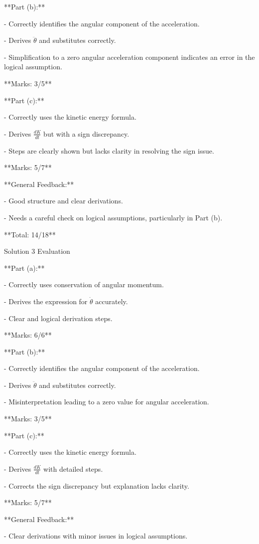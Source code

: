 \documentclass[a4paper,11pt]{article}
\begin{document}
**Part (b):**

- Correctly identifies the angular component of the acceleration.

- Derives \(\ddot{\theta}\) and substitutes correctly.

- Simplification to a zero angular acceleration component indicates an error in the logical assumption.

**Marks: 3/5**

**Part (c):**

- Correctly uses the kinetic energy formula.

- Derives \(\frac{dK}{dt}\) but with a sign discrepancy.

- Steps are clearly shown but lacks clarity in resolving the sign issue.

**Marks: 5/7**

**General Feedback:**

- Good structure and clear derivations.

- Needs a careful check on logical assumptions, particularly in Part (b).

**Total: 14/18**

Solution 3 Evaluation

**Part (a):**

- Correctly uses conservation of angular momentum.

- Derives the expression for \(\dot{\theta}\) accurately.

- Clear and logical derivation steps.

**Marks: 6/6**

**Part (b):**

- Correctly identifies the angular component of the acceleration.

- Derives \(\ddot{\theta}\) and substitutes correctly.

- Misinterpretation leading to a zero value for angular acceleration.

**Marks: 3/5**

**Part (c):**

- Correctly uses the kinetic energy formula.

- Derives \(\frac{dK}{dt}\) with detailed steps.

- Corrects the sign discrepancy but explanation lacks clarity.

**Marks: 5/7**

**General Feedback:**

- Clear derivations with minor issues in logical assumptions.
\end{document}
